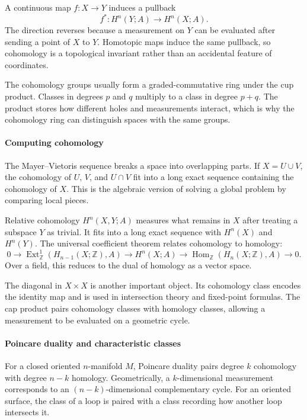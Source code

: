 A continuous map $f:X\to Y$ induces a pullback
\[
 f^*:H^n(Y;A)\longrightarrow H^n(X;A).
\]
The direction reverses because a measurement on $Y$ can be evaluated after sending a point of $X$ to $Y$. Homotopic maps induce the same pullback, so cohomology is a topological invariant rather than an accidental feature of coordinates.

The cohomology groups usually form a graded-commutative ring under the cup product. Classes in degrees $p$ and $q$ multiply to a class in degree $p+q$. The product stores how different holes and measurements interact, which is why the cohomology ring can distinguish spaces with the same groups. \cite{cohomology_theory_ref1,cohomology_theory_ref5}

\paragraph{Computing cohomology}

The Mayer--Vietoris sequence breaks a space into overlapping parts. If $X=U\cup V$, the cohomology of $U$, $V$, and $U\cap V$ fit into a long exact sequence containing the cohomology of $X$. This is the algebraic version of solving a global problem by comparing local pieces.

Relative cohomology $H^n(X,Y;A)$ measures what remains in $X$ after treating a subspace $Y$ as trivial. It fits into a long exact sequence with $H^n(X)$ and $H^n(Y)$. The universal coefficient theorem relates cohomology to homology:
\[
0\to \operatorname{Ext}^1_{\mathbb Z}(H_{n-1}(X;\mathbb Z),A)
\to H^n(X;A)
\to \operatorname{Hom}_{\mathbb Z}(H_n(X;\mathbb Z),A)
\to0.
\]
Over a field, this reduces to the dual of homology as a vector space.

The diagonal in $X\times X$ is another important object. Its cohomology class encodes the identity map and is used in intersection theory and fixed-point formulas. The cap product pairs cohomology classes with homology classes, allowing a measurement to be evaluated on a geometric cycle. \cite{cohomology_theory_ref1,cohomology_theory_ref2}

\paragraph{Poincare duality and characteristic classes}

For a closed oriented $n$-manifold $M$, Poincare duality pairs degree $k$ cohomology with degree $n-k$ homology. Geometrically, a $k$-dimensional measurement corresponds to an $(n-k)$-dimensional complementary cycle. For an oriented surface, the class of a loop is paired with a class recording how another loop intersects it.


